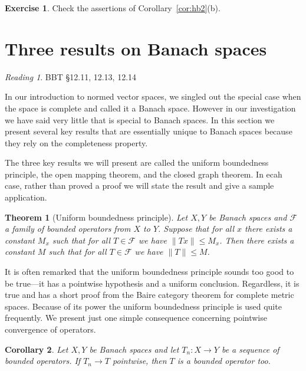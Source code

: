 \documentclass[11pt,oneside]{amsbook}
\theoremstyle{definition}
\newtheorem{exerc}{Exercise}[section]
\theoremstyle{plain}
\newtheorem{thm}{Theorem}[section]
\newtheorem{cor}[thm]{Corollary}
\theoremstyle{definition}
\theoremstyle{remark}
\newtheorem*{reading}{Reading}
\numberwithin{equation}{section}
\numberwithin{figure}{section}
\begin{document}
\begin{exerc}
  Check the assertions of Corollary~\ref{cor:hb2}(b).
\end{exerc}

\newpage
\section{Three results on Banach spaces}

\begin{reading}
  BBT \S 12.11, 12.13, 12.14
\end{reading}

In our introduction to normed vector spaces, we singled out the special case when the space is complete and called it a Banach space. However in our investigation we have said  very little that is special to Banach spaces. In this section we present several key results that are essentially unique to Banach spaces because they rely on the completeness property.

The three key results we will present are called the uniform boundedness principle, the open mapping theorem, and the closed graph theorem. In ecah case, rather than proved a proof we will state the result and give a sample application.

\begin{thm}[Uniform boundedness principle]
  Let $X,Y$ be Banach spaces and $\mathcal F$ a family of bounded operators from $X$ to $Y$. Suppose that for all $x$ there exists a constant $M_x$ such that for all $T\in\mathcal F$ we have $\|Tx\|\leq M_x$. Then there exists a constant $M$ such that for all $T\in\mathcal F$ we have $\|T\|\leq M$.
\end{thm}

It is often remarked that the uniform boundedness principle sounds too good to be true---it has a pointwise hypothesis and a uniform conclusion. Regardless, it is true and has a short proof from the Baire category theorem for complete metric spaces. Because of its power the uniform boundedness principle is used quite frequently. We present just one simple consequence concerning pointwise convergence of operators.

\begin{cor}
  Let $X,Y$ be Banach spaces and let $T_n\colon X\to Y$ be a sequence of bounded operators. If $T_n\to T$ pointwise, then $T$ is a bounded operator too.
\end{cor}
\end{document}
